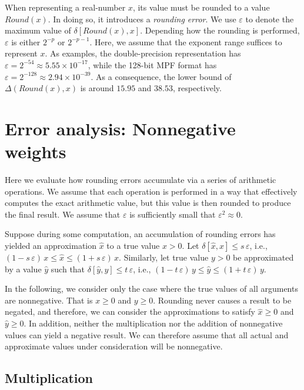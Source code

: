 \documentclass[letterpaper,USenglish,cleveref, autoref, thm-restate]{lipics-v2021}
\newcommand{\approximate}[1]{\hat{#1}}
\newcommand{\approxx}{\approximate{x}}
\newcommand{\approxy}{\approximate{y}}
\newcommand{\round}{\mathit{Round}}
\newcommand{\aerror}{\delta}
\newcommand{\digitprecision}{\Delta}
\newcommand{\roundepsilon}{\varepsilon}
\begin{document}
When representing a real-number $x$, its value must be rounded to a
value $\round(x)$.  In doing so, it introduces a \emph{rounding
error}.  We use $\roundepsilon$ to denote the maximum value of
$\aerror[\round(x), x]$.  Depending how the rounding
is performed, $\roundepsilon$ is either $2^{-p}$ or $2^{-p-1}$.  Here, we assume that the exponent range suffices to represent $x$.
As examples, the double-precision representation has $\roundepsilon = 2^{-54} \approx 5.55 \times 10^{-17}$, while the 128-bit MPF format
has $\roundepsilon = 2^{-128} \approx 2.94 \times 10^{-39}$.  As a consequence, the lower bound of $\digitprecision(\round(x), x)$ is around $15.95$ and $38.53$, respectively.

\section{Error analysis: Nonnegative weights}
\label{sect:nonneg}

Here we evaluate how rounding errors accumulate via a series of arithmetic operations.  We assume that each operation is performed in a way that effectively computes the exact
arithmetic value, but this value is then rounded to produce the final result.  We assume that $\roundepsilon$ is sufficiently small that $\roundepsilon^2 \approx 0$.

Suppose during some computation, an accumulation of rounding errors has yielded an approximation $\approxx$ to a true value $x > 0$.
Let $\aerror[\approxx, x] \leq s\, \roundepsilon$, i.e., $(1-s\,\roundepsilon)\, x \leq \approxx \leq (1+s\,\roundepsilon)\, x$.  Similarly, let true value $y > 0$ be
approximated by a value $\approxy$ such that 
$\aerror[\approxy, y] \leq t\, \roundepsilon$, i.e., $(1-t\,\roundepsilon)\, y \leq \approxy \leq (1+t\,\roundepsilon)\, y$.

In the following, we consider only the case where the true values of
all arguments are nonnegative.  That is $x \geq 0$ and $y \geq 0$.
Rounding never causes a result to be negated, and therefore, we can
consider the approximations to satisfy $\approxx \geq 0$ and $\approxy \geq 0$.
In addition, neither the multiplication nor the addition of
nonnegative values can yield a negative result.  We can therefore
assume that all actual and approximate values under consideration will
be nonnegative.

\subsection{Multiplication}
\end{document}
